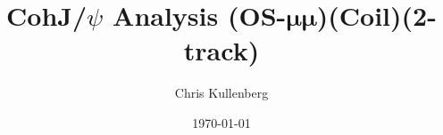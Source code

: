 \title{CohJ/$\psi$ Analysis (\textbf{OS}-$\boldsymbol{\mu\mu}$)(\textbf{Coil})(\textbf{2-track})}
\author{Chris Kullenberg}
\date{\today}
